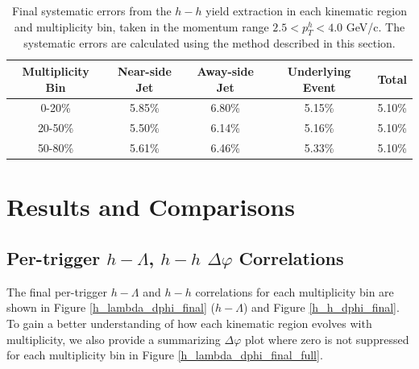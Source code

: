 \documentclass[ALICE,manyauthors]{ALICE_analysis_notes}
\begin{document}
\begin{table}[h!]
\centering
\begin{tabular}{| c | c | c | c | c | }
\hline
Multiplicity Bin & Near-side Jet & Away-side Jet & Underlying Event & Total  \\
\hline
0-20\% & 5.85\%   & 6.80\%  & 5.15\% & 5.10\% \\
20-50\% & 5.50\% & 6.14\%  & 5.16\% & 5.10\% \\
50-80\% & 5.61\% & 6.46\%  & 5.33\% & 5.10\% \\
\hline
\end{tabular}
\caption{Final systematic errors from the $h-h$ yield extraction in each kinematic region and multiplicity bin, taken in the momentum range $2.5 < p_{T}^{h} < 4.0$ GeV/c. The systematic errors are calculated using the method described in this section.}
\label{h_h_yield_extraction_systematics_highpt}
\end{table}








\clearpage

\section{Results and Comparisons}
\label{results}
\subsection{Per-trigger $h-\Lambda$, $h-h$ $\Delta\varphi$ Correlations}
The final per-trigger $h-\Lambda$ and $h-h$ correlations for each multiplicity bin are shown in Figure \ref{h_lambda_dphi_final} ($h-\Lambda$) and Figure \ref{h_h_dphi_final}. To gain a better understanding of how each kinematic region evolves with multiplicity, we also provide a summarizing $\Delta\varphi$ plot where zero is not suppressed for each multiplicity bin in Figure \ref{h_lambda_dphi_final_full}.
\end{document}
